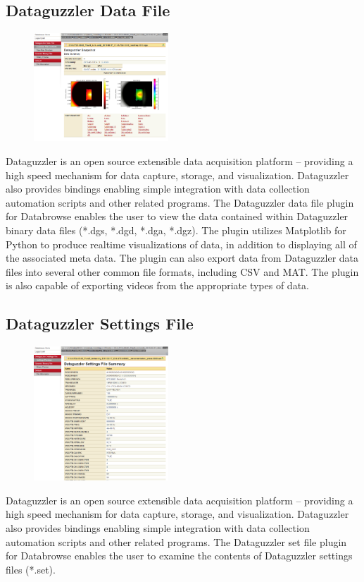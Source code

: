 \documentclass[10pt]{article}
\begin{document}
\subsection{Dataguzzler Data File}
\begin{figure}
		\includegraphics[width=0.45\textwidth]{Dataguzzler_DGS_File.png}
\end{figure}
Dataguzzler is an open source extensible data acquisition platform -- providing a high speed mechanism for data capture, storage, and visualization.  Dataguzzler also provides bindings enabling simple integration with data collection automation scripts and other related programs.  The Dataguzzler data file plugin for Databrowse enables the user to view the data contained within Dataguzzler binary data files (*.dgs, *.dgd, *.dga, *.dgz).  The plugin utilizes Matplotlib for Python to produce realtime visualizations of data, in addition to displaying all of the associated meta data.  The plugin can also export data from Dataguzzler data files into several other common file formats, including CSV and MAT.  The plugin is also capable of exporting videos from the appropriate types of data.

\endgroup


\clearpage
\begingroup
\setlength\intextsep{0pt}
\subsection{Dataguzzler Settings File}
\begin{figure}
		\includegraphics[width=0.45\textwidth]{Dataguzzler_SET_File.png}
\end{figure}
Dataguzzler is an open source extensible data acquisition platform -- providing a high speed mechanism for data capture, storage, and visualization.  Dataguzzler also provides bindings enabling simple integration with data collection automation scripts and other related programs.  The Dataguzzler set file plugin for Databrowse enables the user to examine the contents of Dataguzzler settings files (*.set).
\end{document}
